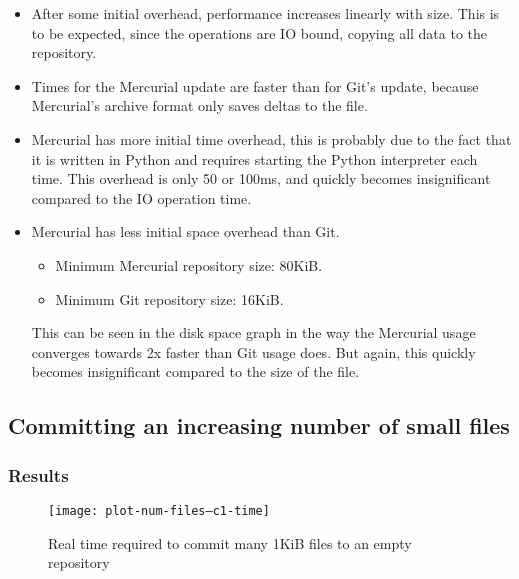 \documentclass[12pt,a4paper,two-side]{book}
\begin{document}
\begin{itemize}

    \item After some initial overhead, performance increases linearly with size.
        This is to be expected, since the operations are IO bound, copying all
        data to the repository.

    \item Times for the Mercurial update are faster than for Git's update,
        because Mercurial's archive format only saves deltas to the file.

    \item Mercurial has more initial time overhead, this is probably due to the
        fact that it is written in Python and requires starting the Python
        interpreter each time. This overhead is only 50 or 100ms, and quickly
        becomes insignificant compared to the IO operation time.

    \item Mercurial has less initial space overhead than Git.

        \begin{itemize}
            \setlength{\itemsep}{0pt}
            \setlength{\parskip}{0pt}
            \setlength{\parsep}{0pt}
            \item Minimum Mercurial repository size: 80KiB.
            \item Minimum Git repository size: 16KiB.
        \end{itemize}

        This can be seen in the disk space graph in the way the Mercurial usage
        converges towards 2x faster than Git usage does. But again, this quickly
        becomes insignificant compared to the size of the file.

\end{itemize}

\fi

\subsection{Committing an increasing number of small files}

\subsubsection{Results}

\begin{figure}[p]
  \caption{Real time required to commit many 1KiB files to an empty repository}
  \label{fig:plot-num-files--c1-time}
  \centering
    \texttt{[image: plot-num-files--c1-time]}
\end{figure}
\end{document}
